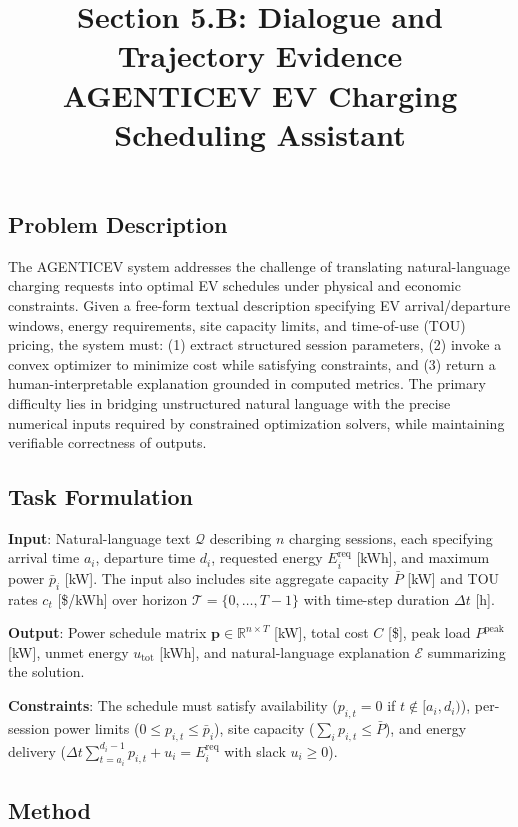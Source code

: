 \documentclass[11pt]{article}
\title{Section 5.B: Dialogue and Trajectory Evidence\\
\large AGENTICEV EV Charging Scheduling Assistant}
\author{}
\date{}
\begin{document}
\maketitle

\subsection*{Problem Description}

The AGENTICEV system addresses the challenge of translating natural-language charging requests into optimal EV schedules under physical and economic constraints. Given a free-form textual description specifying EV arrival/departure windows, energy requirements, site capacity limits, and time-of-use (TOU) pricing, the system must: (1) extract structured session parameters, (2) invoke a convex optimizer to minimize cost while satisfying constraints, and (3) return a human-interpretable explanation grounded in computed metrics. The primary difficulty lies in bridging unstructured natural language with the precise numerical inputs required by constrained optimization solvers, while maintaining verifiable correctness of outputs.

\subsection*{Task Formulation}

\textbf{Input}: Natural-language text $\mathcal{Q}$ describing $n$ charging sessions, each specifying arrival time $a_i$, departure time $d_i$, requested energy $E_i^{\text{req}}$ [kWh], and maximum power $\bar{p}_i$ [kW]. The input also includes site aggregate capacity $\bar{P}$ [kW] and TOU rates $c_t$ [\$/kWh] over horizon $\mathcal{T} = \{0, \ldots, T-1\}$ with time-step duration $\Delta t$ [h].

\textbf{Output}: Power schedule matrix $\mathbf{p} \in \mathbb{R}^{n \times T}$ [kW], total cost $C$ [\$], peak load $P^{\text{peak}}$ [kW], unmet energy $u_{\text{tot}}$ [kWh], and natural-language explanation $\mathcal{E}$ summarizing the solution.

\textbf{Constraints}: The schedule must satisfy availability ($p_{i,t} = 0$ if $t \notin [a_i, d_i)$), per-session power limits ($0 \le p_{i,t} \le \bar{p}_i$), site capacity ($\sum_i p_{i,t} \le \bar{P}$), and energy delivery ($\Delta t \sum_{t=a_i}^{d_i-1} p_{i,t} + u_i = E_i^{\text{req}}$ with slack $u_i \ge 0$).

\subsection*{Method}
\end{document}
